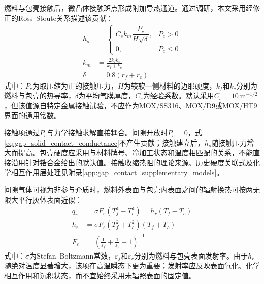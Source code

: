 燃料与包壳接触后，微凸体接触斑点形成附加导热通道。通过调研，本文采用经修正的Ross--Stoute关系描述该贡献\cite{halesBISONTheoryManual2016,rossHEATTRANSFERCOEFFICIENT1962}：
\begin{subequations}\label{eq:gap_solid_contact_model}
	\begin{align}
		h_s
		&=
		\begin{cases}
			C_s k_m\dfrac{P_c}{H\sqrt{\delta}},&P_c>0\\[1.0ex]
			0,&P_c\leq0
		\end{cases}
		\label{eq:gap_solid_contact_conductance}\\
		k_m&=\frac{2k_fk_c}{k_f+k_c}
		\label{eq:gap_effective_solid_conductivity}\\
		\delta&=0.8\left(r_f+r_c\right)
		\label{eq:gap_average_film_thickness}
	\end{align}
\end{subequations}
式中：$P_c$为取压缩为正的接触压力，$H$为较软一侧材料的迈耶硬度，$k_f$和$k_c$分别为燃料与包壳的热导率，$\delta$为平均气膜厚度，$C_s$为经验系数。默认采用$C_s=10\ \mathrm{m^{-1/2}}$，但该值源自特定金属接触试验，不应作为MOX/SS316、MOX/D9或MOX/HT9界面的通用常数。

接触项通过$P_c$与力学接触求解直接耦合。间隙开放时$P_c=0$，式\eqref{eq:gap_solid_contact_conductance}不产生贡献；接触建立后，$h_s$随接触压力增大而提高。包壳硬度应采用与材料牌号、冷加工状态和温度相匹配的关系，不能直接沿用针对锆合金给出的默认值。接触收缩热阻的理论来源、历史硬度关联式及化学相互作用层处理见附录\ref{app:gap_contact_supplementary_models}。


间隙气体可视为非参与介质时，燃料外表面与包壳内表面之间的辐射换热可按两无限大平行灰体表面近似\cite{birdTransportPhenomena1976,halesBISONTheoryManual2016}：
\begin{subequations}\label{eq:gap_radiation_model}
	\begin{align}
		q_r
		&=\sigma F_{\varepsilon}
		\left(T_f^4-T_c^4\right)
		=h_r\left(T_f-T_c\right)
		\label{eq:gap_radiation_heat_flux}\\
		h_r
		&=\sigma F_{\varepsilon}
		\left(T_f^2+T_c^2\right)
		\left(T_f+T_c\right)
		\label{eq:gap_radiation_conductance}\\
		F_{\varepsilon}
		&=\left(
		\frac{1}{\varepsilon_f}
		+\frac{1}{\varepsilon_c}-1
		\right)^{-1}
		\label{eq:gap_emissivity_factor}
	\end{align}
\end{subequations}
式中：$\sigma$为Stefan--Boltzmann常数，$\varepsilon_f$和$\varepsilon_c$分别为燃料与包壳表面发射率。由于$h_r$随绝对温度显著增大，该项在高温瞬态下更为重要；发射率应反映表面氧化、化学相互作用和沉积状态，而不宜始终采用未辐照表面的固定值。

